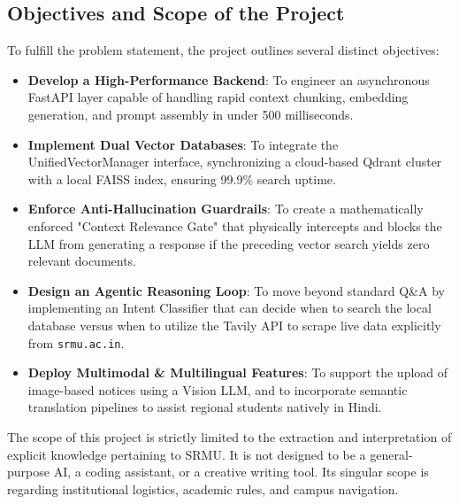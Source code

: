 \documentclass[12pt,a4paper]{report}
\begin{document}
\subsection{Objectives and Scope of the Project}
To fulfill the problem statement, the project outlines several distinct objectives:
\begin{itemize}
    \item \textbf{Develop a High-Performance Backend}: To engineer an asynchronous FastAPI layer capable of handling rapid context chunking, embedding generation, and prompt assembly in under 500 milliseconds.
    \item \textbf{Implement Dual Vector Databases}: To integrate the UnifiedVectorManager interface, synchronizing a cloud-based Qdrant cluster with a local FAISS index, ensuring 99.9\% search uptime.
    \item \textbf{Enforce Anti-Hallucination Guardrails}: To create a mathematically enforced "Context Relevance Gate" that physically intercepts and blocks the LLM from generating a response if the preceding vector search yields zero relevant documents.
    \item \textbf{Design an Agentic Reasoning Loop}: To move beyond standard Q\&A by implementing an Intent Classifier that can decide when to search the local database versus when to utilize the Tavily API to scrape live data explicitly from \texttt{srmu.ac.in}.
    \item \textbf{Deploy Multimodal \& Multilingual Features}: To support the upload of image-based notices using a Vision LLM, and to incorporate semantic translation pipelines to assist regional students natively in Hindi.
\end{itemize}

The scope of this project is strictly limited to the extraction and interpretation of explicit knowledge pertaining to SRMU. It is not designed to be a general-purpose AI, a coding assistant, or a creative writing tool. Its singular scope is regarding institutional logistics, academic rules, and campus navigation.
\end{document}
